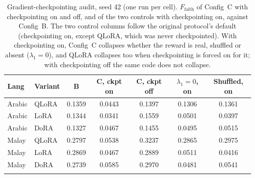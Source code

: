 \begin{table}[t]
\centering
\caption{Gradient-checkpointing audit, seed 42 (one run per cell). $F_{\text{faith}}$ of Config~C with checkpointing on and off, and of the two controls with checkpointing on, against Config~B. The two control columns follow the original protocol's default (checkpointing on, except QLoRA, which was never checkpointed). With checkpointing on, Config~C collapses whether the reward is real, shuffled or absent ($\lambda_1{=}0$), and QLoRA collapses too when checkpointing is forced on for it; with checkpointing off the same code does not collapse.}
\label{tab:ckpt}
\footnotesize
\begin{tabular}{@{}llccccc@{}}
\toprule
\textbf{Lang} & \textbf{Variant} & B & C, ckpt on & C, ckpt off & $\lambda_1{=}0$, on & Shuffled, on \\
\midrule
Arabic & QLoRA & 0.1359 & 0.0443 & 0.1397 & 0.1306 & 0.1361 \\
Arabic & LoRA & 0.1344 & 0.0341 & 0.1559 & 0.0501 & 0.0397 \\
Arabic & DoRA & 0.1327 & 0.0467 & 0.1455 & 0.0495 & 0.0515 \\
\midrule
Malay & QLoRA & 0.2797 & 0.0538 & 0.3237 & 0.2865 & 0.2975 \\
Malay & LoRA & 0.2869 & 0.0467 & 0.2889 & 0.0511 & 0.0416 \\
Malay & DoRA & 0.2739 & 0.0585 & 0.2970 & 0.0481 & 0.0541 \\
\botrule
\end{tabular}
\end{table}